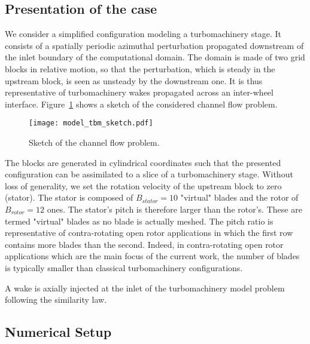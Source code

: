 
\subsection{Presentation of the case}

We consider a simplified 
configuration modeling a turbomachinery 
stage. It consists of a spatially 
periodic azimuthal perturbation propagated downstream 
of the inlet boundary of the computational domain. 
The domain is made of two grid blocks in relative 
motion, so that the perturbation, which is steady 
in the upstream block, is seen as unsteady by the 
downstream one.
It is thus representative of 
turbomachinery wakes propagated across an inter-wheel interface.
Figure~\ref{fig:model_tbm_sketch} shows a sketch
of the considered channel flow problem.
\begin{figure}[htp]
  \centering
  \texttt{[image: model\_tbm\_sketch.pdf]}
  \caption{Sketch of the channel flow problem.}
  \label{fig:model_tbm_sketch}
\end{figure}

The blocks are generated in cylindrical
coordinates such that the presented configuration
can be assimilated to a slice of 
a turbomachinery stage.
Without loss of generality, 
we set the rotation velocity of the upstream block to zero (stator). 
The stator is composed of $B_{stator} = 10$
"virtual" blades and the rotor of $B_{rotor} = 12$ ones.
The stator's pitch is therefore larger than the rotor's.
These are termed "virtual" blades as no blade is actually meshed.
The pitch ratio is representative of 
contra-rotating open rotor applications in which 
the first row contains more blades 
than the second. Indeed, in
contra-rotating open rotor applications which
are the main focus of the current work, the number
of blades is typically smaller than classical
turbomachinery configurations.

A wake is axially injected at the inlet of the
turbomachinery model problem following the \citet{Lakshminarayana1980}
similarity law.



\subsection{Numerical Setup}


